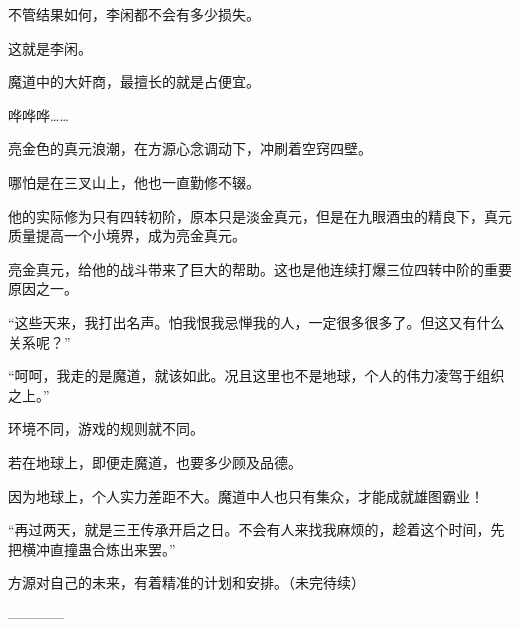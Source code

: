 \begin{this_body}
不管结果如何，李闲都不会有多少损失。

这就是李闲。

魔道中的大奸商，最擅长的就是占便宜。

哗哗哗……

亮金色的真元浪潮，在方源心念调动下，冲刷着空窍四壁。

哪怕是在三叉山上，他也一直勤修不辍。

他的实际修为只有四转初阶，原本只是淡金真元，但是在九眼酒虫的精良下，真元质量提高一个小境界，成为亮金真元。

亮金真元，给他的战斗带来了巨大的帮助。这也是他连续打爆三位四转中阶的重要原因之一。

“这些天来，我打出名声。怕我恨我忌惮我的人，一定很多很多了。但这又有什么关系呢？”

“呵呵，我走的是魔道，就该如此。况且这里也不是地球，个人的伟力凌驾于组织之上。”

环境不同，游戏的规则就不同。

若在地球上，即便走魔道，也要多少顾及品德。

因为地球上，个人实力差距不大。魔道中人也只有集众，才能成就雄图霸业！

“再过两天，就是三王传承开启之日。不会有人来找我麻烦的，趁着这个时间，先把横冲直撞蛊合炼出来罢。”

方源对自己的未来，有着精准的计划和安排。（未完待续）

------------

\end{this_body}

